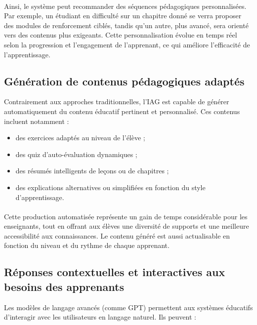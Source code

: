 \paragraph{} Ainsi, le système peut recommander des séquences pédagogiques personnalisées. Par exemple, un étudiant en difficulté sur un chapitre donné se verra proposer des modules de renforcement ciblés, tandis qu’un autre, plus avancé, sera orienté vers des contenus plus exigeants. Cette personnalisation évolue en temps réel selon la progression et l’engagement de l’apprenant, ce qui améliore l’efficacité de l’apprentissage.

\subsection{Génération de contenus pédagogiques adaptés}

Contrairement aux approches traditionnelles, l’IAG est capable de générer automatiquement du contenu éducatif pertinent et personnalisé. Ces contenus incluent notamment :

\begin{itemize}
  \item des exercices adaptés au niveau de l’élève ;
  \item des quiz d’auto-évaluation dynamiques ;
  \item des résumés intelligents de leçons ou de chapitres ;
  \item des explications alternatives ou simplifiées en fonction du style d’apprentissage.
\end{itemize}

\paragraph{} Cette production automatisée représente un gain de temps considérable pour les enseignants, tout en offrant aux élèves une diversité de supports et une meilleure accessibilité aux connaissances. Le contenu généré est aussi actualisable en fonction du niveau et du rythme de chaque apprenant.

\subsection{Réponses contextuelles et interactives aux besoins des apprenants}

Les modèles de langage avancés (comme GPT) permettent aux systèmes éducatifs d’interagir avec les utilisateurs en langage naturel. Ils peuvent :

